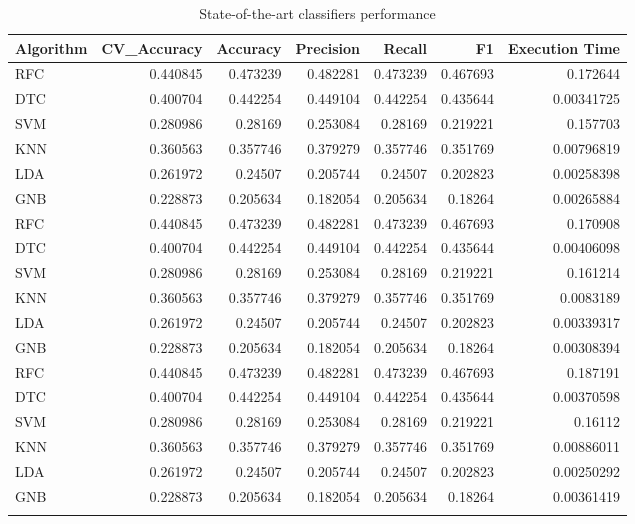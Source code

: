 \documentclass[conference,onecolumn]{IEEEtran}
\begin{document}
    \begin{longtable}{lrrrrrr}
        \hline
         Algorithm   &   CV\_Accuracy &   Accuracy &   Precision &   Recall &       F1 &   Execution Time \\ \hline
         RFC         &      0.440845 &   0.473239 &    0.482281 & 0.473239 & 0.467693 &       0.172644   \\
         DTC         &      0.400704 &   0.442254 &    0.449104 & 0.442254 & 0.435644 &       0.00341725 \\
         SVM         &      0.280986 &   0.28169  &    0.253084 & 0.28169  & 0.219221 &       0.157703   \\
         KNN         &      0.360563 &   0.357746 &    0.379279 & 0.357746 & 0.351769 &       0.00796819 \\
         LDA         &      0.261972 &   0.24507  &    0.205744 & 0.24507  & 0.202823 &       0.00258398 \\
         GNB         &      0.228873 &   0.205634 &    0.182054 & 0.205634 & 0.18264  &       0.00265884 \\
         RFC         &      0.440845 &   0.473239 &    0.482281 & 0.473239 & 0.467693 &       0.170908   \\
         DTC         &      0.400704 &   0.442254 &    0.449104 & 0.442254 & 0.435644 &       0.00406098 \\
         SVM         &      0.280986 &   0.28169  &    0.253084 & 0.28169  & 0.219221 &       0.161214   \\
         KNN         &      0.360563 &   0.357746 &    0.379279 & 0.357746 & 0.351769 &       0.0083189  \\
         LDA         &      0.261972 &   0.24507  &    0.205744 & 0.24507  & 0.202823 &       0.00339317 \\
         GNB         &      0.228873 &   0.205634 &    0.182054 & 0.205634 & 0.18264  &       0.00308394 \\
         RFC         &      0.440845 &   0.473239 &    0.482281 & 0.473239 & 0.467693 &       0.187191   \\
         DTC         &      0.400704 &   0.442254 &    0.449104 & 0.442254 & 0.435644 &       0.00370598 \\
         SVM         &      0.280986 &   0.28169  &    0.253084 & 0.28169  & 0.219221 &       0.16112    \\
         KNN         &      0.360563 &   0.357746 &    0.379279 & 0.357746 & 0.351769 &       0.00886011 \\
         LDA         &      0.261972 &   0.24507  &    0.205744 & 0.24507  & 0.202823 &       0.00250292 \\
         GNB         &      0.228873 &   0.205634 &    0.182054 & 0.205634 & 0.18264  &       0.00361419 \\
        \hline
        \caption{State-of-the-art classifiers performance}
        \label{appdx:stateOfTheArtClassifiersPerformance}
    \end{longtable}
        
\end{document}
